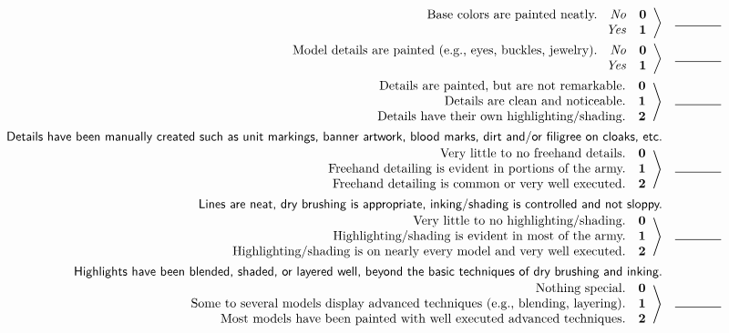 \documentclass[10pt,notitlepage]{report}
\newcommand{\scoredescr}[1]{\makebox[6in][r]{#1}}
\newcommand{\descrdetails}[1]{\makebox[6in][r]{\textsf{#1}}}
\newcommand{\score}[1]{\quad\textbf{#1}}
\newcommand{\yes}{\quad\textit{Yes}}
\newcommand{\no}{\quad\textit{No}}
\newcommand{\entry}{\quad\rule{.5in}{.5pt}}
\begin{document}
\begin{align*}
\left.
\begin{array}{r}
\scoredescr{Base colors are painted neatly.\no\score{0}} \\
\scoredescr{\yes\score{1}}
\end{array}
\right\rangle
 & \entry \\
\left.
\begin{array}{r}
\scoredescr{Model details are painted (e.g., eyes, buckles, jewelry).\no\score{0}} \\
\scoredescr{\yes\score{1}}
\end{array}
\right\rangle
 & \entry \\
\left.
\begin{array}{r}
\scoredescr{Details are painted, but are not remarkable.\score{0}} \\
\scoredescr{Details are clean and noticeable.\score{1}} \\
\scoredescr{Details have their own highlighting/shading.\score{2}}
\end{array}
\right\rangle
 & \entry \\
\descrdetails{Details have been manually created such as unit markings, banner artwork, blood marks, dirt and/or filigree on cloaks, etc.} \\[-3pt]
\left.
\begin{array}{r}
\scoredescr{Very little to no freehand details.\score{0}} \\
\scoredescr{Freehand detailing is evident in portions of the army.\score{1}} \\
\scoredescr{Freehand detailing is common or very well executed.\score{2}}
\end{array}
\right\rangle
 & \entry \\
\descrdetails{Lines are neat, dry brushing is appropriate, inking/shading is controlled and not sloppy.} \\[-3pt]
\left.
\begin{array}{r}
\scoredescr{Very little to no highlighting/shading.\score{0}} \\
\scoredescr{Highlighting/shading is evident in most of the army.\score{1}} \\
\scoredescr{Highlighting/shading is on nearly every model and very well executed.\score{2}}
\end{array}
\right\rangle
 & \entry \\
\descrdetails{Highlights have been blended, shaded, or layered well, beyond the basic techniques of dry brushing and inking.} \\[-3pt]
\left.
\begin{array}{r}
\scoredescr{Nothing special.\score{0}} \\
\scoredescr{Some to several models display advanced techniques (e.g., blending, layering).\score{1}} \\
\scoredescr{Most models have been painted with well executed advanced techniques.\score{2}}
\end{array}
\right\rangle
 & \entry \\
\end{align*}
\end{document}

